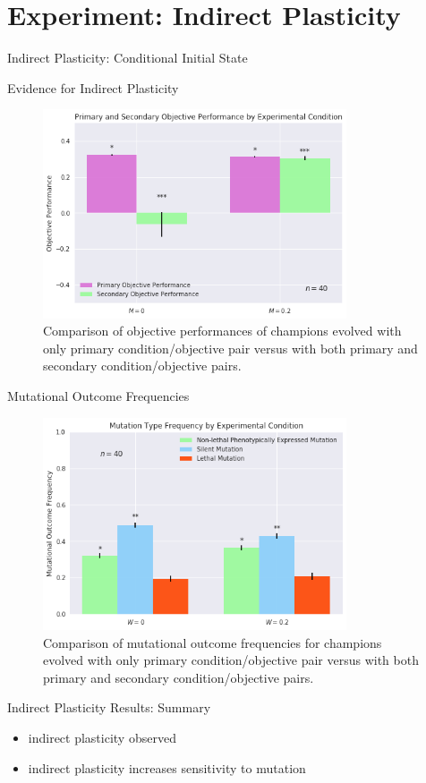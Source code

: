 \section{Experiment: Indirect Plasticity}

\begin{frame}{Indirect Plasticity: Conditional Initial State}

\end{frame}

\begin{frame}{Evidence for Indirect Plasticity}
\begin{figure}
    \centering
    \includegraphics[width=0.8\textwidth]{img/primary_secondary_performance}
 	\captionsetup{singlelinecheck=off,justification=raggedright}
  	\caption{Comparison of objective performances of champions evolved with only primary condition/objective pair versus with both primary and secondary condition/objective pairs.}
    \label{fig:ev_w0}
\end{figure}
\end{frame}

\begin{frame}{Mutational Outcome Frequencies}
\begin{figure}
    \centering
    \includegraphics[width=0.8\textwidth]{img/mutation_type_indirect}
 	\captionsetup{singlelinecheck=off,justification=raggedright}
  	\caption{Comparison of mutational outcome frequencies for champions evolved with only primary condition/objective pair versus with both primary and secondary condition/objective pairs.}
    \label{fig:mutation_type_indirect}
\end{figure}
\end{frame}


\begin{frame}{Indirect Plasticity Results: Summary}
\begin{itemize}
  \item indirect plasticity observed
  \item indirect plasticity increases sensitivity to mutation
\end{itemize}
\end{frame}